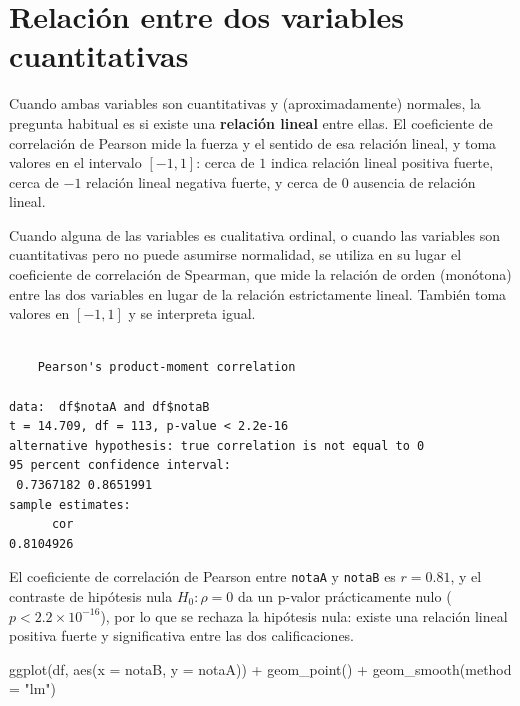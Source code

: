 \documentclass[
  spanish,
  a4paper,
]{scrreport}
\newenvironment{Shaded}{\begin{snugshade}}{\end{snugshade}}
\newcommand{\AttributeTok}[1]{\textcolor[rgb]{0.40,0.45,0.13}{#1}}
\newcommand{\FunctionTok}[1]{\textcolor[rgb]{0.28,0.35,0.67}{#1}}
\newcommand{\NormalTok}[1]{\textcolor[rgb]{0.00,0.23,0.31}{#1}}
\newcommand{\SpecialCharTok}[1]{\textcolor[rgb]{0.37,0.37,0.37}{#1}}
\newcommand{\StringTok}[1]{\textcolor[rgb]{0.13,0.47,0.30}{#1}}
\theoremstyle{definition}
\theoremstyle{definition}
\theoremstyle{remark}
\begin{document}
\section{Relación entre dos variables
cuantitativas}\label{relaciuxf3n-entre-dos-variables-cuantitativas}

Cuando ambas variables son cuantitativas y (aproximadamente) normales,
la pregunta habitual es si existe una \textbf{relación lineal} entre
ellas. El coeficiente de correlación de Pearson mide la fuerza y el
sentido de esa relación lineal, y toma valores en el intervalo
\([-1,1]\): cerca de \(1\) indica relación lineal positiva fuerte, cerca
de \(-1\) relación lineal negativa fuerte, y cerca de \(0\) ausencia de
relación lineal.

Cuando alguna de las variables es cualitativa ordinal, o cuando las
variables son cuantitativas pero no puede asumirse normalidad, se
utiliza en su lugar el coeficiente de correlación de Spearman, que mide
la relación de orden (monótona) entre las dos variables en lugar de la
relación estrictamente lineal. También toma valores en \([-1,1]\) y se
interpreta igual.

\begin{Shaded}
\end{Shaded}

\begin{verbatim}

    Pearson's product-moment correlation

data:  df$notaA and df$notaB
t = 14.709, df = 113, p-value < 2.2e-16
alternative hypothesis: true correlation is not equal to 0
95 percent confidence interval:
 0.7367182 0.8651991
sample estimates:
      cor 
0.8104926 
\end{verbatim}

El coeficiente de correlación de Pearson entre \texttt{notaA} y
\texttt{notaB} es \(r = 0.81\), y el contraste de hipótesis nula
\(H_0: \rho = 0\) da un p-valor prácticamente nulo
(\(p < 2.2 \times 10^{-16}\)), por lo que se rechaza la hipótesis nula:
existe una relación lineal positiva fuerte y significativa entre las dos
calificaciones.

\begin{Shaded}
\begin{Highlighting}[]
\FunctionTok{ggplot}\NormalTok{(df, }\FunctionTok{aes}\NormalTok{(}\AttributeTok{x =}\NormalTok{ notaB, }\AttributeTok{y =}\NormalTok{ notaA)) }\SpecialCharTok{+}
  \FunctionTok{geom\_point}\NormalTok{() }\SpecialCharTok{+}
  \FunctionTok{geom\_smooth}\NormalTok{(}\AttributeTok{method =} \StringTok{"lm"}\NormalTok{)}
\end{Highlighting}
\end{Shaded}
\end{document}
